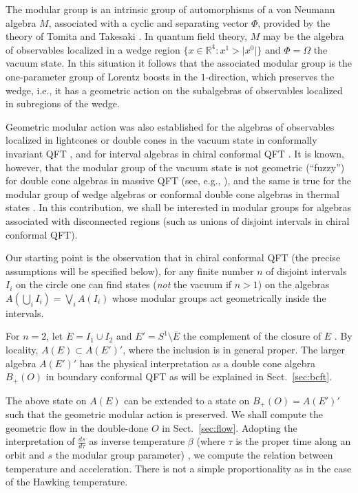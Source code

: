 \documentclass[12pt]{article}
\def \RR {{\mathbb R}}
\newcommand{\dd}[2]{\frac{d{#2}}{d{#1}}}
\begin{document}
The modular group \cite[Chap.\ VI, Thm.\ 1.19]{T} is an intrinsic
group of automorphisms of a von Neumann algebra $M$, associated with a
cyclic and separating vector $\Phi$, provided by the theory of Tomita
and Takesaki \cite{HHW,T}. In quantum field theory, $M$ may be the
algebra of observables localized in a wedge region
$\{x\in\RR^4:x^1>\vert x^0\vert\}$ and $\Phi=\Omega$ the 
vacuum state. In this situation it follows \cite{BW} that the
associated modular group is the one-parameter group of Lorentz boosts
in the $1$-direction, which preserves the wedge, i.e., it has a
geometric action on the subalgebras of observables localized in
subregions of the wedge. 

Geometric modular action was also established for the algebras of
observables localized in lightcones or double cones in the vacuum state in 
conformally invariant QFT \cite{Bu,HL}, and for interval algebras in
chiral conformal QFT \cite{GL}. It is known, however, that the 
modular group of the vacuum state is not geometric (``fuzzy'') for
double cone algebras in massive QFT (see, e.g., \cite{Bo,TS}), and the
same is true for the modular group of wedge algebras or conformal
double cone algebras in thermal states \cite{BY}. In this
contribution, we shall be interested in modular groups for algebras
associated with disconnected regions (such as unions of disjoint
intervals in chiral conformal QFT). 

Our starting point is the observation \cite{KL05} that in chiral conformal
QFT (the precise assumptions will be specified below), for any finite
number $n$ of disjoint intervals $I_i$ on the circle one can 
find states ({\em not} the vacuum if $n>1$) on the algebras $A(\bigcup_i
I_i)=\bigvee_i A(I_i)$ whose modular
groups act geometrically inside the intervals.

For $n=2$, let $E=I_1\cup I_2$ and $E'=S^1\setminus \overline E$ the
complement of the closure of $E$ . By locality, $A(E)\subset A(E')'$,
where the inclusion is in general proper. The larger algebra $A(E')'$
has the physical interpretation as a double cone algebra $B_+(O)$ in
boundary conformal QFT \cite{LR04} as will be explained in Sect.\
\ref{sec:bcft}. 

The above state on $A(E)$ can be extended to a state on $B_+(O)=
A(E')'$ such that the geometric modular action is preserved. We shall
compute the geometric flow in the double-done $O$ in Sect.\
\ref{sec:flow}. Adopting the interpretation of $\dd\tau s$ as inverse
temperature $\beta$ (where $\tau$ is the proper time along an orbit and
$s$ the modular group parameter) \cite{CR,MR}, we compute the relation
between temperature and acceleration. There is not a simple
proportionality as in the case of the Hawking temperature. 
\end{document}
